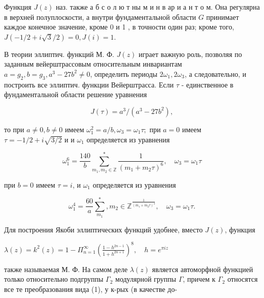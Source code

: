 \documentclass[10pt]{article}
\begin{document}
Функция $J(z)$ наз. также а б с о л ю т ны м и н в ар и а н т о м. Она регулярна в верхней полуплоскости, а внутри фундаментальной области $G$ принимает каждое конечное значение, кроме 0 и 1 , в точности один раз; кроме того, $J(-1 / 2+i \sqrt{3} / 2)=0, J(i)=1$.



В теории эллиптич. функций М. Ф. $J(z)$ играет важную роль, позволяя по заданным вейерштрассовым относительным инвариантам $a=g_{2}, b=g_{3}, a^{3}-27 b^{2} \neq 0$, определить периоды $2 \omega_{1}, 2 \omega_{3}$, а следовательно, и построить все эллиптич. функции Вейерштрасса. Если $\tau$ - единственное в фундаментальной области решение уравнения



\[

J(\tau)=a^{3} /\left(a^{3}-27 b^{2}\right),

\]



то при $a \neq 0, b \neq 0$ имеем $\omega_{1}^{2}=a / b, \omega_{3}=\omega_{1} \tau ;$ при $a=0$ имеем $\tau=-1 / 2+i \sqrt{3 / 2}$ и и $\omega_{1}$ определяется из уравнения



\[

\omega_{1}^{6}=\frac{140}{b} \sum_{m_{1}, m_{2} \in \mathbb{Z}}^{*} \frac{1}{\left(m_{1}+m_{2} \tau\right)^{6}}, \quad \omega_{3}=\omega_{1} \tau

\]



при $b=0$ имеем $\tau=i$, и $\omega_{1}$ определяется из уравнения



\[

\omega_{1}^{4}=\frac{60}{a} \sum_{m_{1}}^{*}, m_{2} \in \mathbb{Z}^{\frac{1}{\left(m_{1}+m_{2} \tau\right)^{4}}}, \quad \omega_{3}=\omega_{1} \tau .

\]



Для построения Якоби эллиптических функций удобнее, вместо $J(z)$, функция



$\lambda(z)=k^{2}(z)=1-\Pi_{n=1}^{\infty}\left(\frac{1-h^{2 n-1}}{1+h^{2 n+1}}\right)^{8}, \quad h=e^{\pi i z}$



также называемая М. Ф. На самом деле $\lambda(z)$ является автоморфной функцией только относительно подгруппы $\Gamma_{2}$ модулярной группы $\Gamma$, причем к $\Gamma_{2}$ относятся все те преобразования вида (1), у к-рых (в качестве до-
\end{document}
